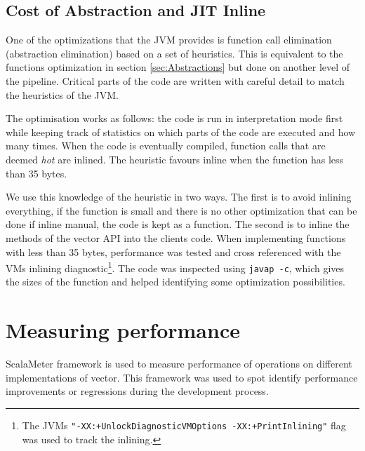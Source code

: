\subsection{Cost of Abstraction and JIT Inline}
One of the optimizations that the JVM provides is function call elimination (abstraction elimination) based on a set of heuristics. This is equivalent to the functions optimization in section \ref{sec:Abstractions} but done on another level of the pipeline. Critical parts of the code are written with careful detail to match the heuristics of the JVM. 

The optimisation works as follows: the code is run in interpretation mode first while keeping track of statistics on which parts of the code are executed and how many times. When the code is eventually compiled, function calls that are deemed \emph{hot} are inlined. The heuristic favours inline when the function has less than 35 bytes. 

We use this knowledge of the heuristic in two ways. The first is to avoid inlining everything, if the function is small and there is no other optimization that can be done if inline manual, the code is kept as a function. The second is to inline the methods of the vector API into the clients code. When implementing functions with less than 35 bytes, performance was tested and cross referenced with the VMs inlining diagnostic\footnote{The JVMs \texttt{"-XX:+UnlockDiagnosticVMOptions -XX:+PrintInlining"} flag was used to track the inlining.}. The code was inspected using \texttt{javap -c}, which gives the sizes of the function and helped identifying some optimization possibilities.

\clearpage
\section{Measuring performance}
ScalaMeter framework\cite{scalameter} is used to measure performance of operations on different implementations of vector. This framework was used to spot identify performance improvements or regressions during the development process. 

